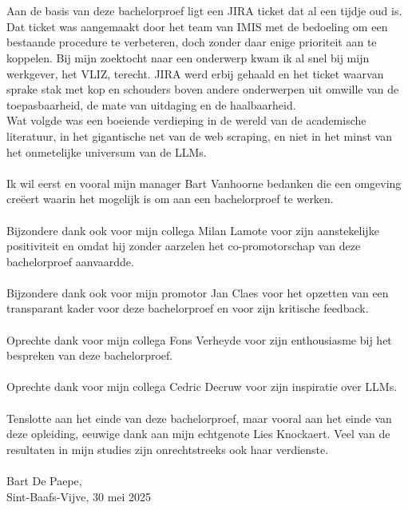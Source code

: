 
\chapter*{}%
\label{ch:voorwoord}


Aan de basis van deze bachelorproef ligt een JIRA ticket dat al een tijdje oud is. Dat ticket was aangemaakt door het team van IMIS met de bedoeling om een bestaande procedure te verbeteren, doch zonder daar enige prioriteit aan te koppelen. Bij mijn zoektocht naar een onderwerp kwam ik al snel bij mijn werkgever, het VLIZ, terecht. JIRA werd erbij gehaald en het ticket waarvan sprake stak met kop en schouders boven andere onderwerpen uit omwille van de toepasbaarheid, de mate van uitdaging en de haalbaarheid.\\
Wat volgde was een boeiende verdieping in de wereld van de academische literatuur, in het gigantische net van de web scraping, en niet in het minst van het onmetelijke universum van de LLMs.\\\\
Ik wil eerst en vooral mijn manager Bart Vanhoorne bedanken die een omgeving creëert waarin het mogelijk is om aan een bachelorproef te werken.\\\\
Bijzondere dank ook voor mijn collega Milan Lamote voor zijn aanstekelijke positiviteit en omdat hij zonder aarzelen het co-promotorschap van deze bachelorproef aanvaardde.\\\\
Bijzondere dank ook voor mijn promotor Jan Claes voor het opzetten van een transparant kader voor deze bachelorproef en voor zijn kritische feedback.\\\\
Oprechte dank voor mijn collega Fons Verheyde voor zijn enthousiasme bij het bespreken van deze bachelorproef.\\\\
Oprechte dank voor mijn collega Cedric Decruw voor zijn inspiratie over LLMs.\\\\
Tenslotte aan het einde van deze bachelorproef, maar vooral aan het einde van deze opleiding, eeuwige dank aan mijn echtgenote Lies Knockaert. Veel van de resultaten in mijn studies zijn onrechtstreeks ook haar verdienste.
\\\\
Bart De Paepe,\\
Sint-Baafs-Vijve, 30 mei 2025